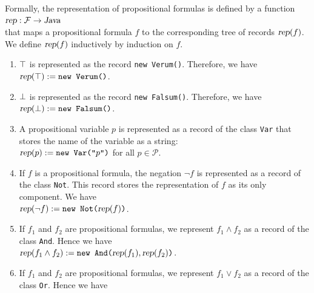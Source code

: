 Formally, the representation of propositional formulas is defined by a function 
\\[0.2cm]
\hspace*{1.3cm}
$\textsl{rep}: \mathcal{F} \rightarrow \textsl{Java}$
\\[0.2cm]
that maps a propositional formula $f$ to the corresponding tree of records 
$\textsl{rep}(f)$.  We define $\textsl{rep}(f)$ inductively by induction on $f$.
\begin{enumerate}
\item $\top$ is represented as the record \texttt{new Verum()}.  Therefore, we have  
      \\[0.2cm]
      \hspace*{1.3cm}
      $\textsl{rep}(\top) := \texttt{new Verum()}$.
\item $\bot$ is represented as the record \texttt{new Falsum()}.      
      Therefore, we have
      \\[0.2cm]
      \hspace*{1.3cm}
      $\textsl{rep}(\bot) := \texttt{new Falsum()}$.
\item A propositional variable $p$ is represented as a record of the class \texttt{Var} that stores the name of
      the variable as a string:
      \\[0.2cm]
      \hspace*{1.3cm}
      $\textsl{rep}(p) := \texttt{new Var(\symbol{34}$p$\symbol{34})}$ \quad for all $p \in \mathcal{P}$.
\item If $f$ is a propositional formula, the  negation $\neg f$ is represented as a record of the class
      \texttt{Not}.  This record stores the representation of $f$ as its only component.  We have
      \\[0.2cm]
      \hspace*{1.3cm} 
      $\textsl{rep}(\neg f) := \texttt{new Not(}\textsl{rep}(f)\texttt{)}$.
\item If $f_1$ and $f_2$ are propositional formulas, we represent $f_1 \wedge f_2$ as a record of the class
      \texttt{And}.  Hence we have
      \\[0.2cm]
      \hspace*{1.3cm} 
      $\textsl{rep}(f_1 \wedge f_2) := \texttt{new And(}\textsl{rep}(f_1), \textsl{rep}(f_2)\texttt{)}$.
\item If $f_1$ and $f_2$ are propositional formulas, we represent $f_1 \vee f_2$ as a record of the class
      \texttt{Or}. Hence we have
      \\[0.2cm]

\end{enumerate}
